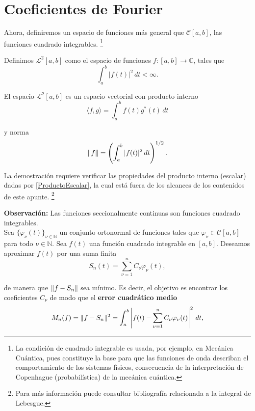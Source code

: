 \newpage
\section{Coeficientes de Fourier}

Ahora, definiremos un espacio de funciones más general que $\mathcal{C}[a,b]$, las funciones cuadrado integrables. \footnote{La condición de cuadrado integrable es usada, por ejemplo, en Mecánica Cuántica, pues constituye la base para que las funciones de onda describan el comportamiento de los sistemas físicos, consecuencia de la interpretación de Copenhague (probabilística) de la mecánica cuántica.}

\begin{defi}
    Definimos $\mathcal{L}^2[a,b]$ como el espacio de funciones $f:[a,b] \rightarrow \mathbb{C}$, tales que 
    $$\int_a^b |f(t)|^2 \,dt < \infty.$$
\end{defi}

\begin{teorema}
El espacio $\mathcal{L}^2[a,b]$ es un espacio vectorial con producto interno 
$$\langle f,g \rangle = \int_a^b f(t) g^* (t) \,dt$$

y norma
$$\lVert f\rVert = \left( \int_a^b |f(t)|^2 \,dt \right)^{1/2}.$$
\end{teorema}

La demostración requiere verificar las propiedades del producto interno (escalar) dadas por \ref{ProductoEscalar}, la cual está fuera de los alcances de los contenidos de este apunte. \footnote{Para más información puede consultar bibliografía relacionada a la integral de Lebesgue.} 

\textbf{Observación:} Las funciones seccionalmente continuas son funciones cuadrado integrables.
\\

Sea $\{\varphi_{\nu}(t)\}_{\nu \in \mathbb{N}}$ un conjunto ortonormal de funciones tales que $\varphi_{\nu} \in \mathcal{C}[a,b]$ para todo $\nu \in \mathbb{N}$. Sea $f(t)$ una función cuadrado integrable en $[a,b]$. Deseamos aproximar $f(t)$ por una suma finita 
$$S_n(t) = \sum_{\nu = 1}^n C_{\nu} \varphi_{\nu}(t),$$

de manera que $\lVert f - S_n\rVert$ sea mínimo. Es decir, el objetivo es encontrar los coeficientes $C_{\nu}$ de modo que el \textbf{error cuadrático medio}
$$M_n(f) = \lVert f-S_n\rVert^2 = \int_a^b \left| f(t) - \sum_{\nu = 1}^n C_{\nu} \varphi_{\nu}(t) \right|^2 \,dt,$$


